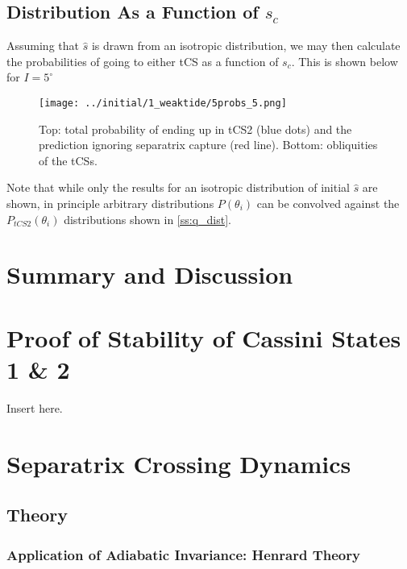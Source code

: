 \documentclass[
        fleqn,
        usenatbib,
        referee,
    ]{mnras}
\newcommand*{\p}[1]{\left(#1\right)}
\begin{document}
\subsection{Distribution As a Function of $s_c$}\label{ss:s_c_dist}

Assuming that $\hat{s}$ is drawn from an isotropic distribution, we may then
calculate the probabilities of going to either tCS as a function of $s_c$. This
is shown below for $I = 5^\circ$
\begin{figure}[t]
    \centering
    \texttt{[image: ../initial/1\_weaktide/5probs\_5.png]}
    \caption{Top: total probability of ending up in tCS2 (blue dots) and the
    prediction ignoring separatrix capture (red line). Bottom:
    obliquities of the tCSs.}\label{fig:probs}
\end{figure}

Note that while only the results for an isotropic distribution of initial
$\hat{s}$ are shown, in principle arbitrary distributions $P\p{\theta_i}$ can be
convolved against the $P_{tCS2}\p{\theta_i}$ distributions shown in
\autoref{ss:q_dist}.

\section{Summary and Discussion}\label{s:summary}




\appendix
\section{Proof of Stability of Cassini States 1 \& 2}\label{app:cs_stab}

Insert here.

\section{Separatrix Crossing Dynamics}

\subsection{Theory}\label{app:sep_crossing_dynamics}

\subsubsection{Application of Adiabatic Invariance: Henrard Theory}
\end{document}
